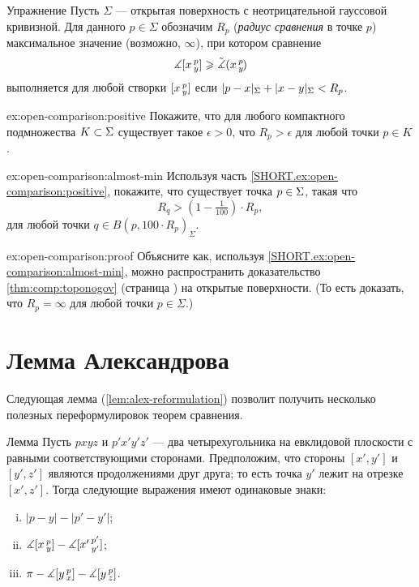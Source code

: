 \begin{thm}{Упражнение}\label{ex:open-comparison}
Пусть $\Sigma$ --- открытая поверхность с неотрицательной гауссовой кривизной.
Для данного $p\in\Sigma$ обозначим $R_p$ 
(\emph{радиус сравнения} в точке $p$) 
максимальное значение (возможно, $\infty$), при котором сравнение 
\[\measuredangle[x\,{}^{p}_{y}]
\geqslant\tilde\measuredangle(x\,{}^{p}_{y}\hspace{-0.2ex})\]
выполняется для любой створки $[x\,{}^{p}_{y}]$ если $\dist{p}{x}\Sigma+\dist{x}{y}\Sigma<R_p$.

\begin{subthm}{ex:open-comparison:positive}
Покажите, что для любого компактного подмножества $K\z\subset \Sigma$ существует такое $\epsilon>0$, что $R_p>\epsilon$ для любой точки $p\in K$.
\end{subthm}

\begin{subthm}{ex:open-comparison:almost-min}
Используя часть \ref{SHORT.ex:open-comparison:positive}, покажите, что 
существует точка $p\z\in\Sigma$, такая что 
\[R_q>(1-\tfrac1{100})\cdot R_p,\]
для любой точки $q\in B(p,100\cdot R_p)_\Sigma$.
\end{subthm}

\begin{subthm}{ex:open-comparison:proof}
Объясните как, используя \ref{SHORT.ex:open-comparison:almost-min}, можно распространить доказательство \ref{thm:comp:toponogov} (страница \pageref{proof(thm:comp:toponogov)}) на открытые поверхности. 
(То есть доказать, что $R_p=\infty$ для любой точки $p\in\Sigma$.) 
\end{subthm}

\end{thm}

\section{Лемма Александрова}

Следующая лемма (\ref{lem:alex-reformulation}) позволит получить несколько полезных переформулировок теорем сравнения.

\begin{thm}{Лемма}
\label{lem:alex}
Пусть $pxyz$ и $p'x'y'z'$ --- два четырехугольника на евклидовой плоскости с равными соответствующими сторонами.
Предположим, что стороны $[x',y']$ и $[y',z']$ являются продолжениями друг друга; то есть точка $y'$ лежит на отрезке $[x',z']$.
Тогда следующие выражения имеют одинаковые знаки:
\begin{enumerate}[(i)]
 \item $|p-y|-|p'-y'|$;
 \item $\measuredangle[x\,{}^{p}_{y}]-\measuredangle[x'\,{}^{p'}_{y'}]$;
 \item $\pi-\measuredangle[y\,{}^{p}_{x}]-\measuredangle[y\,{}^{p}_{z}]$.
\end{enumerate}
\end{thm}

